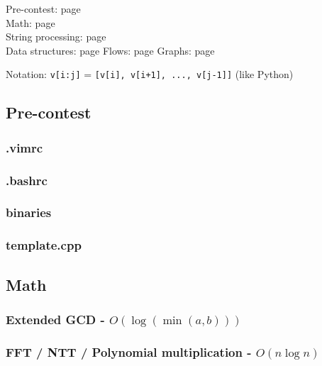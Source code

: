 \documentclass[landscape,a4paper,twocolumn,10pt]{report}
\begin{document}
\footnotesize

\noindent
Pre-contest: page \pageref{precontest} \\
Math: page \pageref{math} \\
String processing: page \pageref{string} \\
Data structures: page \pageref{datastruct}
Flows: page \pageref{flows}
Graphs: page \pageref{graphs}

\noindent
Notation: \verb#v[i:j]# = \verb#[v[i], v[i+1], ..., v[j-1]]# (like Python)

\subsection*{Pre-contest}
\label{precontest}

\subsubsection{.vimrc}


\subsubsection*{.bashrc}


\subsubsection*{binaries}


\subsubsection{template.cpp}




\subsection*{Math}
\label{math}

\subsubsection{Extended GCD - $O(\log(\min(a, b)))$}


\subsubsection{FFT / NTT / Polynomial multiplication - $O(n \log n)$}

\end{document}
